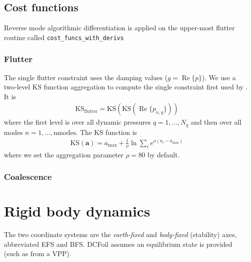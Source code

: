 \documentclass[10pt]{article}
\newcommand{\mbf}[1]{\mathbf{#1}}
\newcommand{\be}{\begin{eqnarray}}
\newcommand{\ee}{\end{eqnarray}}
\newcommand{\tn}[1]{\textrm{#1}}
\renewcommand{\Re}{\operatorname{Re}}
\begin{document}
\subsection{Cost functions}
% 
Reverse mode algorithmic differentiation is applied on the upper-most flutter routine called \texttt{cost\_funcs\_with\_derivs}

\subsubsection{Flutter}
% 
The single flutter constraint uses the damping values ($g = \Re\{p\}$).
We use a two-level KS function aggregation to compute the single constraint first used by \citet{Jonsson2017a}.
It is
%
\be
\label{eqn:KS}
\tn{KS}_{\tn{flutter}} = \tn{KS}\left(\tn{KS} \left( \Re\{p_{n,q}\} \right)\right)
\ee
%
where the first level is over all dynamic pressures $q = 1,\dots,N_q$ and then over all modes $n = 1,\dots,\tn{nmodes}$.
The KS function is
\be
\tn{KS}(\mbf{a}) = a_{\tn{max}} + \frac{1}{\rho}  \ln \sum_i e^{\rho \left( a_i - a_{\tn{max}}\right)}
\ee
where we set the aggregation parameter $\rho=80$ by default.


\subsubsection{Coalescence}

\section{Rigid body dynamics}
% 
The two coordinate systems are the \emph{earth-fixed} and \emph{body-fixed} (stability) axes, abbreviated EFS and BFS.
DCFoil assumes an equilibrium state is provided (such as from a VPP).
% 
\end{document}

